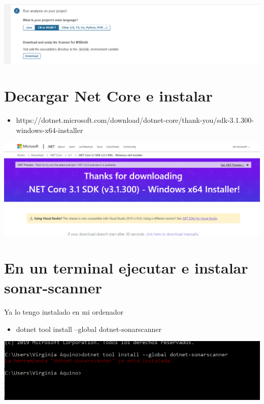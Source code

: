 \begin{center}
\includegraphics[width=\columnwidth]{images/8}\newline
\end{center}
\section{Decargar Net Core e instalar} 

\begin{itemize}
    \item  https://dotnet.microsoft.com/download/dotnet-core/thank-you/sdk-3.1.300-windows-x64-installer
\end{itemize}
\begin{center}
\includegraphics[width=\columnwidth]{images/18}\newline
\end{center}

\section{En un terminal ejecutar e instalar sonar-scanner} 
Ya lo tengo instalado en mi ordenador
\begin{itemize}
    \item  dotnet tool install --global dotnet-sonarscanner
\end{itemize}
\begin{center}
\includegraphics[width=\columnwidth]{images/10}\newline
\end{center}
